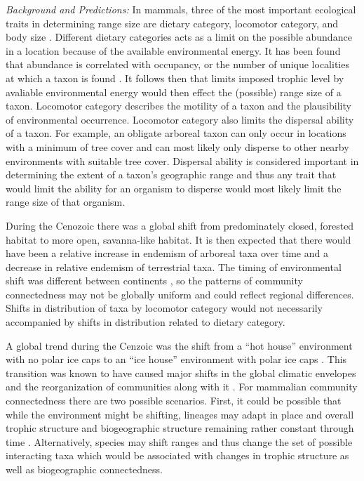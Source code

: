 \documentclass[12pt,letterpaper]{article}
\begin{document}
\textit{Background and Predictions:}
In mammals, three of the most important ecological traits in determining range size are dietary category, locomotor category, and body size \citep{Jernvall2004,Smith2008b,Smith2004,Lyons2005,Lyons2010}. Different dietary categories acts as a limit on the possible abundance in a location because of the available environmental energy. It has been found that abundance is correlated with occupancy, or the number of unique localities at which a taxon is found \citep{Jernvall2002,Fortelius2002,Brown1984}. It follows then that limits imposed trophic level by avaliable environmental energy would then effect the (possible) range size of a taxon. Locomotor category describes the motility of a taxon and the plausibility of environmental occurrence. Locomotor category also limits the dispersal ability of a taxon. For example, an obligate arboreal taxon can only occur in locations with a minimum of tree cover and can most likely only disperse to other nearby environments with suitable tree cover. Dispersal ability is considered important in determining the extent of a taxon's geographic range \citep{Birand2012,Jablonski2006a,Gaston2009} and thus any trait that would limit the ability for an organism to disperse would most likely limit the range size of that organism.

During the Cenozoic there was a global shift from predominately closed, forested habitat to more open, savanna-like habitat. It is then expected that there would have been a relative increase in endemism of arboreal taxa over time and a decrease in relative endemism of terrestrial taxa. The timing of environmental shift was different between continents \citep{Stromberg2005,Stromberg2013}, so the patterns of community connectedness may not be globally uniform and could reflect regional differences. Shifts in distribution of taxa by locomotor category would not necessarily accompanied by shifts in distribution related to dietary category.

A global trend during the Cenzoic was the shift from a ``hot house'' environment with no polar ice caps to an ``ice house'' environment with polar ice caps \citep{Zachos2008,Zachos2001}. This transition was known to have caused major shifts in the global climatic envelopes and the reorganization of communities along with it \citep{Janis1993a,Fortelius2002,Blois2009,Alroy2000g,Figueirido2012}. For mammalian community connectedness there are two possible scenarios. First, it could be possible that while the environment might be shifting, lineages may adapt in place and overall trophic structure and biogeographic structure remaining rather constant through time \citep{Jernvall2004}. Alternatively, species may shift ranges and thus change the set of possible interacting taxa which would be associated with changes in trophic structure as well as biogeographic connectedness.
\end{document}
